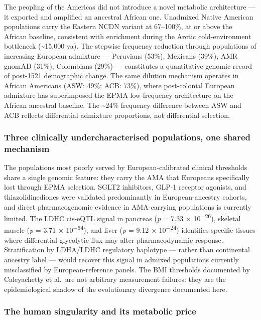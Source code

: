 \documentclass[
  letterpaper,
  DIV=11,
  numbers=noendperiod]{scrartcl}
\begin{document}
The peopling of the Americas did not introduce a novel metabolic
architecture --- it exported and amplified an ancestral African one.
Unadmixed Native American populations carry the Eastern NCDN variant at
67--100\%, at or above the African baseline, consistent with enrichment
during the Arctic cold-environment bottleneck (\textasciitilde15,000
ya). The stepwise frequency reduction through populations of increasing
European admixture --- Peruvians (53\%), Mexicans (39\%), AMR gnomAD
(31\%), Colombians (29\%) --- constitutes a quantitative genomic record
of post-1521 demographic change. The same dilution mechanism operates in
African Americans (ASW: 49\%; ACB: 73\%), where post-colonial European
admixture has superimposed the EPMA low-frequency architecture on the
African ancestral baseline. The \textasciitilde24\% frequency difference
between ASW and ACB reflects differential admixture proportions, not
differential selection.

\subsubsection{Three clinically undercharacterised populations, one
shared
mechanism}\label{three-clinically-undercharacterised-populations-one-shared-mechanism}

The populations most poorly served by European-calibrated clinical
thresholds share a single genomic feature: they carry the AMA that
Europeans specifically lost through EPMA selection. SGLT2 inhibitors,
GLP-1 receptor agonists, and thiazolidinediones were validated
predominantly in European-ancestry cohorts, and direct pharmacogenomic
evidence in AMA-carrying populations is currently limited. The LDHC
cis-eQTL signal in pancreas (\emph{p} = 7.33 ×
10\textsuperscript{−26}), skeletal muscle (\emph{p} = 3.71 ×
10\textsuperscript{−64}), and liver (\emph{p} = 9.12 ×
10\textsuperscript{−24}) identifies specific tissues where differential
glycolytic flux may alter pharmacodynamic response. Stratification by
LDHA/LDHC regulatory haplotype --- rather than continental ancestry
label --- would recover this signal in admixed populations currently
misclassified by European-reference panels. The BMI thresholds
documented by Caleyachetty et al.~are not arbitrary measurement
failures: they are the epidemiological shadow of the evolutionary
divergence documented here.

\subsubsection{The human singularity and its metabolic
price}\label{the-human-singularity-and-its-metabolic-price}
\end{document}
